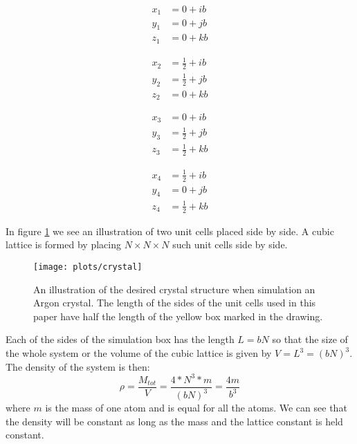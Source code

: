 \documentclass[11pt,a4wide]{article}
\begin{document}
\begin{minipage}{0.2\textwidth}
\begin{align*}
x_1 &= 0 + ib\\
y_1 &= 0 + jb \\
z_1 &= 0 + kb
\end{align*}
\smallskip
\end{minipage}
\begin{minipage}{0.25\textwidth}
\begin{align*}
x_2 &= \frac{1}{2} + ib\\
y_2 &= \frac{1}{2} + jb \\
z_2 &= 0 + kb
\end{align*}
\smallskip
\end{minipage}
\begin{minipage}{0.25\textwidth}
\begin{align*}
x_3 &= 0 + ib\\
y_3 &= \frac{1}{2} + jb \\
z_3 &= \frac{1}{2} + kb
\end{align*}
\smallskip
\end{minipage}
\begin{minipage}{0.25\textwidth}
\begin{align*}
x_4 &= \frac{1}{2} + ib\\
y_4 &= 0 + jb \\
z_4 &= \frac{1}{2} + kb
\end{align*}
\smallskip
\end{minipage}
In figure \ref{fig: ar_crystal} we see an illustration of two unit cells placed side by side. A cubic lattice is formed by placing $N\times N \times N$ such unit cells side by side. 

\begin{figure}
\centering
\texttt{[image: plots/crystal]}
\caption{An illustration of the desired crystal structure when simulation an Argon crystal. The length of the sides of the unit cells used in this paper have half the length of the yellow box marked in the drawing.}
\label{fig: ar_crystal}
\end{figure}


Each of the sides of the simulation box has the length $L = bN$ so that the size of the whole system or the volume of the cubic lattice is given by $V = L^3 = (bN)^3$. The density of the system is then:
\[
\rho = \frac{M_{tot}}{V} = \frac{4*N^3*m}{(bN)^3} = \frac{4m}{b^3}
\]
where $m$ is the mass of one atom and is equal for all the atoms. We can see that the density will be constant as long as the mass and the lattice constant is held constant. 
\end{document}
